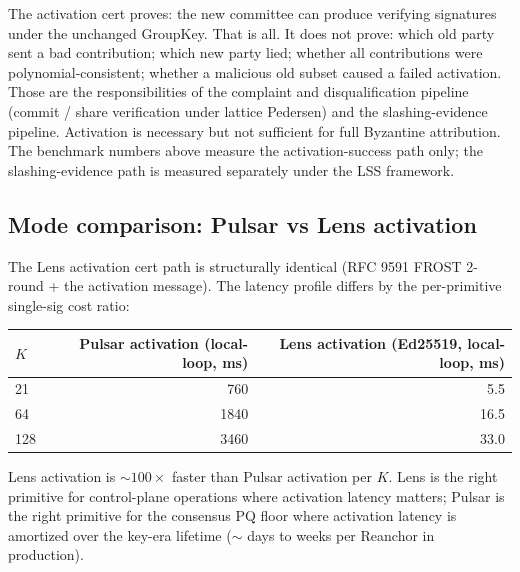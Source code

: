 The activation cert proves: the new committee can produce verifying signatures under the unchanged GroupKey. That is all. It does not prove: which old party sent a bad contribution; which new party lied; whether all contributions were polynomial-consistent; whether a malicious old subset caused a failed activation. Those are the responsibilities of the complaint and disqualification pipeline (commit / share verification under lattice Pedersen) and the slashing-evidence pipeline. Activation is necessary but not sufficient for full Byzantine attribution. The benchmark numbers above measure the activation-success path only; the slashing-evidence path is measured separately under the LSS framework.

\subsection{Mode comparison: Pulsar vs Lens activation}

The Lens activation cert path is structurally identical (RFC 9591 FROST 2-round + the activation message). The latency profile differs by the per-primitive single-sig cost ratio:

\begin{tabular}{@{}lrr@{}}
  \toprule
  \textbf{$K$} & \textbf{Pulsar activation (local-loop, ms)} & \textbf{Lens activation (Ed25519, local-loop, ms)} \\
  \midrule
  21 & 760 & 5.5 \\
  64 & 1840 & 16.5 \\
  128 & 3460 & 33.0 \\
  \bottomrule
\end{tabular}

Lens activation is $\sim 100\times$ faster than Pulsar activation per $K$. Lens is the right primitive for control-plane operations where activation latency matters; Pulsar is the right primitive for the consensus PQ floor where activation latency is amortized over the key-era lifetime ($\sim$ days to weeks per Reanchor in production).

